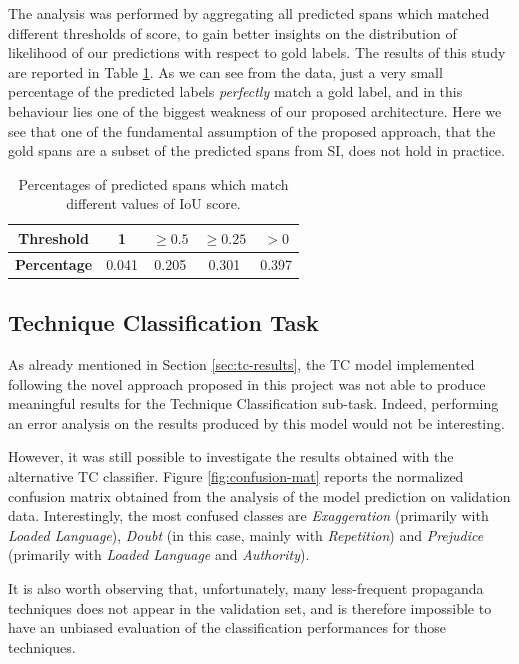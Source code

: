 \documentclass[11pt]{article}
\newcommand{\pol}[1]{{\fontfamily{pcr}\selectfont#1}}
\begin{document}
The analysis was performed by aggregating all predicted spans which matched different thresholds of score, to gain better insights on the distribution of likelihood of our predictions with respect to gold labels. The results of this study are reported in Table \ref{table:iou}. As we can see from the data, just a very small percentage of the predicted labels \textit{perfectly} match a gold label, and in this behaviour lies one of the biggest weakness of our proposed architecture. Here we see that one of the fundamental assumption of the proposed approach, that the gold spans are a subset of the predicted spans from \pol{SI}, does not hold in practice.

\begin{table}[h]
\begin{tabular}{ |c | c| c| c| c| } 
\hline
 \textbf{Threshold} & 1 & $\geq 0.5$ & $\geq 0.25$ & $ > 0$ \\ 
\hline
\textbf{Percentage} & 0.041 & 0.205 & 0.301 & 0.397 \\
 \hline
\end{tabular}
\caption{Percentages of predicted spans which match different values of \pol{IoU} score.}
 \label{table:iou}
\end{table}

\subsection{Technique Classification Task}
As already mentioned in Section \ref{sec:tc-results}, the \pol{TC} model implemented following the novel approach proposed in this project was not able to produce meaningful results for the Technique Classification sub-task. Indeed, performing an error analysis on the results produced by this model would not be interesting.

However, it was still possible to investigate the results obtained with the alternative \pol{TC} classifier. Figure \ref{fig:confusion-mat} reports the normalized confusion matrix obtained from the analysis of the model prediction on validation data. Interestingly, the most confused classes are \textit{Exaggeration} (primarily with \textit{Loaded Language}), \textit{Doubt} (in this case, mainly with \textit{Repetition}) and \textit{Prejudice} (primarily with \textit{Loaded Language} and \textit{Authority}).

It is also worth observing that, unfortunately, many less-frequent propaganda techniques does not appear in the validation set, and is therefore impossible to have an unbiased evaluation of the classification performances for those techniques.
\end{document}
